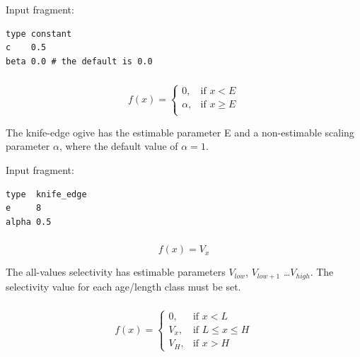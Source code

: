 Input fragment: {\small{\begin{verbatim}
type constant
c    0.5
beta 0.0 # the default is 0.0
\end{verbatim}}}

\subsubsection[Knife-edge]{}\label{sec:Selectivity-KnifeEdge} 

\begin{equation}
f(x)= \begin{cases}
  0, & \text{if $x < E$} \\
  \alpha, & \text{if $x \ge E$}\\
  \end{cases}
\end{equation}

The knife-edge ogive has the estimable parameter E and a non-estimable scaling parameter $\alpha$, where the default value of $\alpha = 1$.

Input fragment: {\small{\begin{verbatim}
type  knife_edge
e     8
alpha 0.5
\end{verbatim}}}

\subsubsection[All-values]{}\label{sec:Selectivity-AllValues}

\begin{equation}
f(x)=V_x
\end{equation}

The all-values selectivity has estimable parameters $V_{low}$, $V_{low+1}$ \ldots $V_{high}$. The selectivity value for each age/length class must be set.

\subsubsection[All-values-bounded]{}\label{sec:Selectivity-AllValuesBounded}

\begin{equation}
f(x)=\begin{cases}
		 0, & \text{if $x < L$} \\
		 V_x, & \text{if $L \le x \le H$} \\
		 V_H, & \text{if $x > H$}
  \end{cases}
\end{equation}

